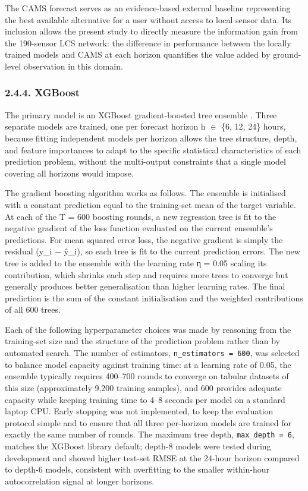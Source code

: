The CAMS forecast serves as an evidence-based external baseline representing the best available alternative for a user without access to local sensor data. Its inclusion allows the present study to directly measure the information gain from the 190-sensor LCS network: the difference in performance between the locally trained models and CAMS at each horizon quantifies the value added by ground-level observation in this domain.

\subsubsection{2.4.4. XGBoost}\label{xgboost}

The primary model is an XGBoost gradient-boosted tree ensemble \cite{chen2016xgboost}. Three separate models are trained, one per forecast horizon h $\in$ \{6, 12, 24\} hours, because fitting independent models per horizon allows the tree structure, depth, and feature importances to adapt to the specific statistical characteristics of each prediction problem, without the multi-output constraints that a single model covering all horizons would impose.

The gradient boosting algorithm works as follows. The ensemble is initialised with a constant prediction equal to the training-set mean of the target variable. At each of the T = 600 boosting rounds, a new regression tree is fit to the negative gradient of the loss function evaluated on the current ensemble's predictions. For mean squared error loss, the negative gradient is simply the residual (y\_i − ŷ\_i), so each tree is fit to the current prediction errors. The new tree is added to the ensemble with the learning rate η = 0.05 scaling its contribution, which shrinks each step and requires more trees to converge but generally produces better generalisation than higher learning rates. The final prediction is the sum of the constant initialisation and the weighted contributions of all 600 trees.

Each of the following hyperparameter choices was made by reasoning from the training-set size and the structure of the prediction problem rather than by automated search. The number of estimators, \texttt{n\_estimators\ =\ 600}, was selected to balance model capacity against training time: at a learning rate of 0.05, the ensemble typically requires 400--700 rounds to converge on tabular datasets of this size (approximately 9,200 training samples), and 600 provides adequate capacity while keeping training time to 4--8 seconds per model on a standard laptop CPU. Early stopping was not implemented, to keep the evaluation protocol simple and to ensure that all three per-horizon models are trained for exactly the same number of rounds. The maximum tree depth, \texttt{max\_depth\ =\ 6}, matches the XGBoost library default; depth-8 models were tested during development and showed higher test-set RMSE at the 24-hour horizon compared to depth-6 models, consistent with overfitting to the smaller within-hour autocorrelation signal at longer horizons.

